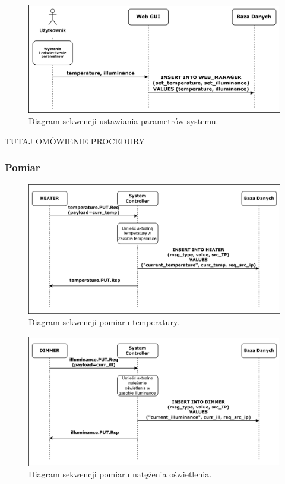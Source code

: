             \begin{figure}[H]
                \centering
                \includegraphics[width=0.8\linewidth]{graphics/sequence-diagrams/user-webgui-db-diagram.png}
                \caption{Diagram sekwencji ustawiania parametrów systemu.}
                \label{fig:seq-user-webgui-db}
            \end{figure}

        TUTAJ OMÓWIENIE PROCEDURY

        \subsubsection{Pomiar}

            \begin{figure}[H]
                \centering
                \includegraphics[width=0.8\linewidth]{graphics/sequence-diagrams/heater-measure-seq.png}
                \caption{Diagram sekwencji pomiaru temperatury.}
                \label{fig:seq-heater-measure-db}
            \end{figure}

            \begin{figure}[H]
                \centering
                \includegraphics[width=0.8\linewidth]{graphics/sequence-diagrams/dimmer-measure-seq.png}
                \caption{Diagram sekwencji pomiaru natężenia oświetlenia.}
                \label{fig:seq-dimmer-measure-db}
            \end{figure}

